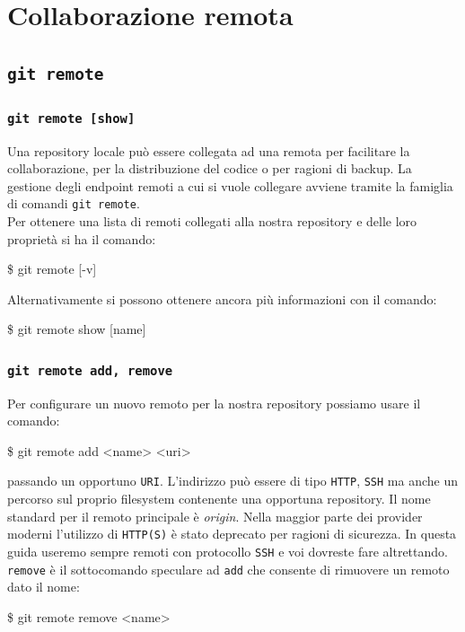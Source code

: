 \documentclass{beamer}
\begin{document}
\section{Collaborazione remota}

\subsection{\texttt{git remote}}
\begin{frame}
  \frametitle{\texttt{git remote [show]}}
  Una repository locale pu\`o essere collegata ad una remota per facilitare la
  collaborazione, per la distribuzione del codice o per ragioni di backup.
  La gestione degli endpoint remoti a cui si vuole collegare avviene tramite la
  famiglia di comandi \texttt{git remote}. \\
  Per ottenere una lista di remoti collegati alla nostra repository e delle
  loro propriet\`a si ha il comando:
  \begin{semiverbatim}
  \$ git remote [-v]
  \end{semiverbatim}
  Alternativamente si possono ottenere ancora pi\`u informazioni con il comando:
  \begin{semiverbatim}
  \$ git remote show [name]
  \end{semiverbatim}
\end{frame}

\begin{frame}
  \frametitle{\texttt{git remote add, remove}}
  Per configurare un nuovo remoto per la nostra repository possiamo usare il
  comando:
  \begin{semiverbatim}
  \$ git remote add <name> <uri>
  \end{semiverbatim}
  passando un opportuno \texttt{URI}. L'indirizzo pu\`o essere di tipo
  \texttt{HTTP}, \texttt{SSH} ma anche un percorso sul proprio filesystem
  contenente una opportuna repository. Il nome standard per il remoto principale
  \`e \emph{origin}. Nella maggior parte dei provider moderni l'utilizzo di
  \texttt{HTTP(S)} \`e stato deprecato per ragioni di sicurezza. In questa guida
  useremo sempre remoti con protocollo \texttt{SSH} e voi dovreste fare
  altrettando. \\
  \texttt{remove} \`e il sottocomando speculare ad \texttt{add} che consente di
  rimuovere un remoto dato il nome:
  \begin{semiverbatim}
  \$ git remote remove <name>
  \end{semiverbatim}
\end{frame}
\end{document}
